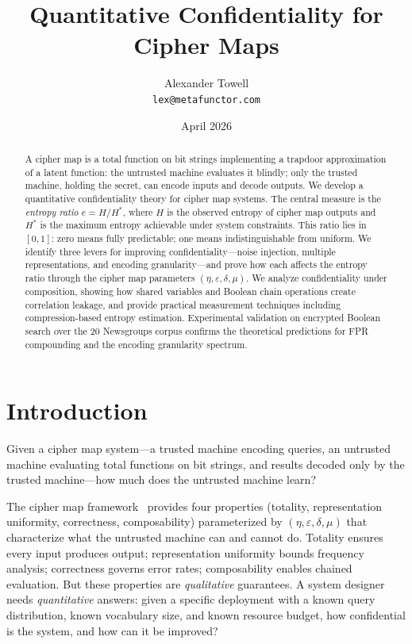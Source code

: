 \documentclass[11pt]{article}
\title{Quantitative Confidentiality for Cipher Maps}
\author{Alexander Towell\\\texttt{lex@metafunctor.com}}
\date{April 2026}
\theoremstyle{definition}
\theoremstyle{plain}
\theoremstyle{remark}
\begin{document}
\maketitle

\begin{abstract}
A cipher map is a total function on bit strings implementing a trapdoor
approximation of a latent function: the untrusted machine evaluates it
blindly; only the trusted machine, holding the secret, can encode inputs
and decode outputs.  We develop a quantitative confidentiality theory for
cipher map systems.  The central measure is the \emph{entropy ratio}
$e = H/H^*$, where $H$ is the observed entropy of cipher map outputs and
$H^*$ is the maximum entropy achievable under system constraints.  This
ratio lies in $[0,1]$: zero means fully predictable; one means
indistinguishable from uniform.  We identify three levers for improving
confidentiality---noise injection, multiple representations, and encoding
granularity---and prove how each affects the entropy ratio through the
cipher map parameters $(\eta, \varepsilon, \delta, \mu)$.  We analyze
confidentiality under composition, showing how shared variables and
Boolean chain operations create correlation leakage, and provide
practical measurement techniques including compression-based entropy
estimation.  Experimental validation on encrypted Boolean search over the
20 Newsgroups corpus confirms the theoretical predictions for FPR
compounding and the encoding granularity spectrum.
\end{abstract}


\section{Introduction}
\label{sec:intro}

Given a cipher map system---a trusted machine encoding queries, an
untrusted machine evaluating total functions on bit strings, and results
decoded only by the trusted machine---how much does the untrusted machine
learn?

The cipher map framework~\cite{towell2026cipher} provides four properties
(totality, representation uniformity, correctness, composability)
parameterized by $(\eta, \varepsilon, \delta, \mu)$ that characterize
what the untrusted machine can and cannot do.  Totality ensures every
input produces output; representation uniformity bounds frequency
analysis; correctness governs error rates; composability enables chained
evaluation.  But these properties are \emph{qualitative} guarantees.  A
system designer needs \emph{quantitative} answers: given a specific
deployment with a known query distribution, known vocabulary size, and
known resource budget, how confidential is the system, and how can it be
improved?
\end{document}
